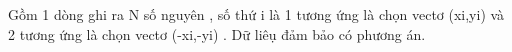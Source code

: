 Gồm 1 dòng ghi ra N số nguyên , số thứ i là 1 tương ứng là chọn vectơ (xi,yi) và 2 tương ứng là chọn vectơ (-xi,-yi) . Dữ liêụ đảm bảo có phương án.  

\